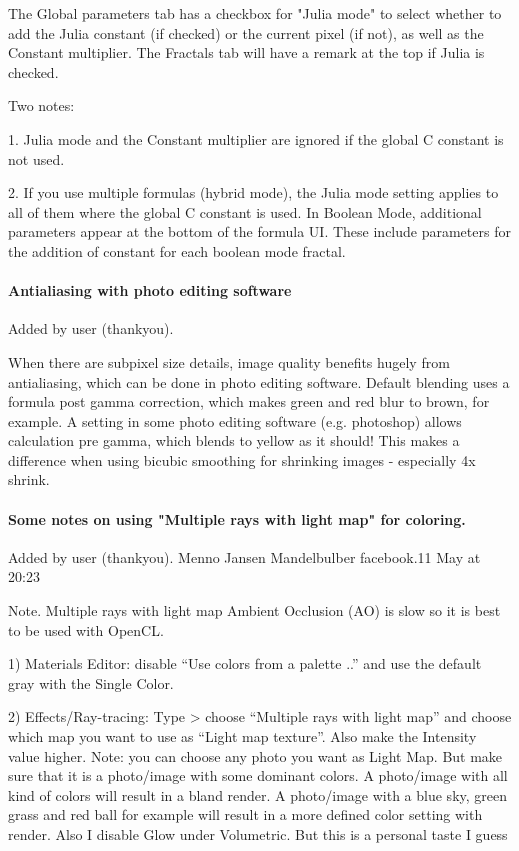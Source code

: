 The Global parameters tab has a checkbox for "Julia mode" to select whether to add the Julia constant (if checked) or the current pixel (if not), as well as the Constant multiplier. The Fractals tab will have a remark at the top if Julia is checked.

Two notes:

1. Julia mode and the Constant multiplier are ignored if the global C constant is not used.

2. If you use multiple formulas (hybrid mode), the Julia mode setting applies to all of them where the global C constant is used. In Boolean Mode, additional parameters appear at the bottom of the formula UI. These include parameters for the addition of constant for each boolean mode fractal.


\paragraph{Antialiasing with photo editing software}
Added by user (thankyou).

When there are subpixel size details, image quality benefits hugely from antialiasing, which can be done in photo editing software. Default blending uses a formula post gamma correction, which makes green and red blur to brown, for example. A setting in some photo editing software (e.g. photoshop) allows calculation pre gamma, which blends to yellow as it should! This makes a difference when using bicubic smoothing for shrinking images - especially 4x shrink.

\paragraph{Some notes on using "Multiple rays with light map" for coloring.}
Added by user (thankyou).
Menno Jansen 
Mandelbulber facebook.11 May at 20:23

Note. Multiple rays with light map Ambient Occlusion (AO) is slow so it is best to be used with OpenCL.

1) Materials Editor: disable “Use colors from a palette ..” and use the default gray with the Single Color.

2) Effects/Ray-tracing: Type > choose “Multiple rays with light map” and choose which map you want to use as “Light map texture”. Also make the Intensity value higher.
Note: you can choose any photo you want as Light Map. But make sure that it is a photo/image with some dominant colors. A photo/image with all kind of colors will result in a bland render. A photo/image with a blue sky, green grass and red ball for example will result in a more defined color setting with render.
Also I disable Glow under Volumetric. But this is a personal taste I guess

